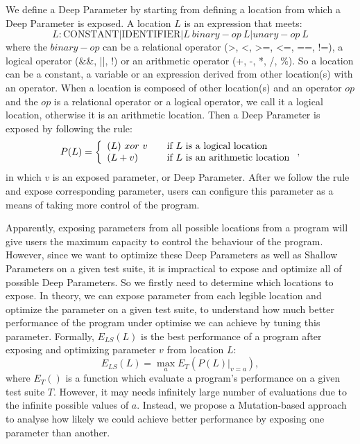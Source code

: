 We define a Deep Parameter by starting from defining a location from which a Deep Parameter is exposed. A location $L$ is an expression that meets:
\begin{equation}
L: \mbox{CONSTANT} | \mbox{IDENTIFIER} | L\ binary-op\ L | unary-op\ L
\end{equation}
where the $binary-op$ can be a relational operator (>, <, >=, <=, ==, !=), a logical operator (\&\&, ||, !) or an arithmetic operator (+, -, *, /, \%). So a location can be a constant, a variable or an expression derived from other location(s) with an operator. When a location is composed of other location(s) and an operator $op$ and the $op$ is a relational operator or a logical operator, we call it a logical location, otherwise it is an arithmetic location. Then a Deep Parameter is exposed by following the rule:
\begin{equation}
 P(L) = \left\{
  \begin{array}{l l}
    (L) \ xor \ v & \quad \text{if $L$ is a logical location}\\
    (L + v) & \quad \text{if $L$ is an arithmetic location}
  \end{array} \right.,
\end{equation}
in which $v$ is an exposed parameter, or Deep Parameter. After we follow the rule and expose corresponding parameter, users can configure this parameter as a means of taking more control of the program.

Apparently, exposing parameters from all possible locations from a program will give users the maximum capacity to control the behaviour of the program. However, since we want to optimize these Deep Parameters as well as Shallow Parameters on a given test suite, it is impractical to expose and optimize all of possible Deep Parameters. So we firstly need to determine which locations to expose. In theory, we can expose parameter from each legible location and optimize the parameter on a given test suite, to understand how much better performance of the program under optimise we can achieve by tuning this parameter. Formally, $E_{LS}(L)$ is the best performance of a program after exposing and optimizing parameter $v$ from location $L$:
\begin{equation}
E_{LS}(L)=\max_{a} E_T(P(L)|_{v=a}),
\end{equation}
where $E_T()$ is a function which evaluate a program's performance on a given test suite $T$. However, it may needs infinitely large number of evaluations due to the infinite possible values of $a$. Instead, we propose a Mutation-based approach to analyse how likely we could achieve better performance by exposing one parameter than another.


